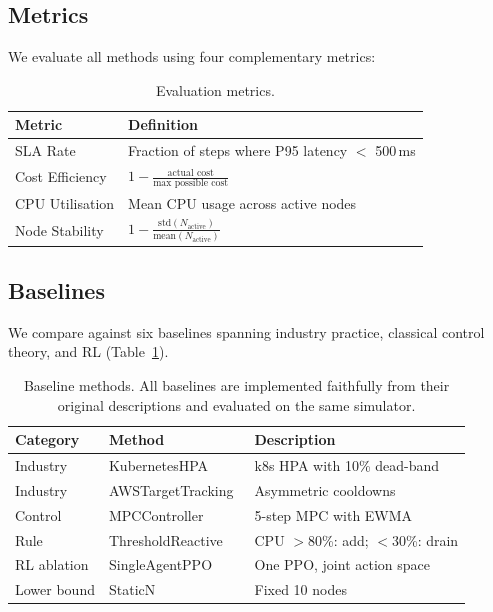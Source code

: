 \documentclass[conference]{IEEEtran}
\begin{document}
\subsection{Metrics}

We evaluate all methods using four complementary metrics:

\begin{table}[h]
\centering
\caption{Evaluation metrics.}
\begin{tabular}{lp{5.2cm}}
\toprule
\textbf{Metric} & \textbf{Definition} \\
\midrule
SLA Rate & Fraction of steps where P95 latency $<$ 500\,ms \\
Cost Efficiency & $1 - \frac{\text{actual cost}}{\text{max possible cost}}$ \\
CPU Utilisation & Mean CPU usage across active nodes \\
Node Stability & $1 - \frac{\text{std}(N_{\text{active}})}{\text{mean}(N_{\text{active}})}$ \\
\bottomrule
\end{tabular}
\end{table}

\subsection{Baselines}

We compare against six baselines spanning industry practice, classical control
theory, and RL (Table~\ref{tab:baselines}).

\begin{table}[h]
\centering
\caption{Baseline methods.  All baselines are implemented faithfully from their
original descriptions and evaluated on the same simulator.}
\label{tab:baselines}
\begin{tabular}{llp{3.0cm}}
\toprule
\textbf{Category} & \textbf{Method} & \textbf{Description} \\
\midrule
Industry & KubernetesHPA~\cite{k8s_hpa} & k8s HPA with 10\% dead-band \\
Industry & AWSTargetTracking~\cite{aws_autoscaling} & Asymmetric cooldowns \\
Control  & MPCController~\cite{zhang2023aware} & 5-step MPC with EWMA \\
Rule     & ThresholdReactive & CPU $>$80\%: add; $<$30\%: drain \\
RL ablation & SingleAgentPPO & One PPO, joint action space \\
Lower bound & StaticN & Fixed 10 nodes \\
\bottomrule
\end{tabular}
\end{table}
\end{document}
